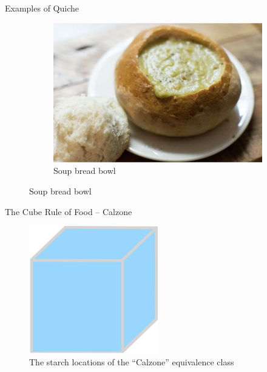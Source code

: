 \documentclass{beamer}
\begin{document}
\begin{frame}{Examples of Quiche}
\begin{figure}
\begin{subfigure}{.4\textwidth}
          \centering
          \includegraphics[width=.8\linewidth]{quiche/24_soup_bread_bowl.jpg}
          \caption{\label{fig:soup-bread-bowl}Soup bread bowl}
        \end{subfigure}
    \end{figure}
\end{frame}

\begin{frame}{The Cube Rule of Food -- Calzone}
    \begin{figure}
        \includegraphics[width=0.5\textwidth]{calzone/26_calzone.jpg}
        \caption{\label{fig:calzone-diagram}The starch locations of the ``Calzone'' equivalence class}
    \end{figure}
\end{frame}
\end{document}

